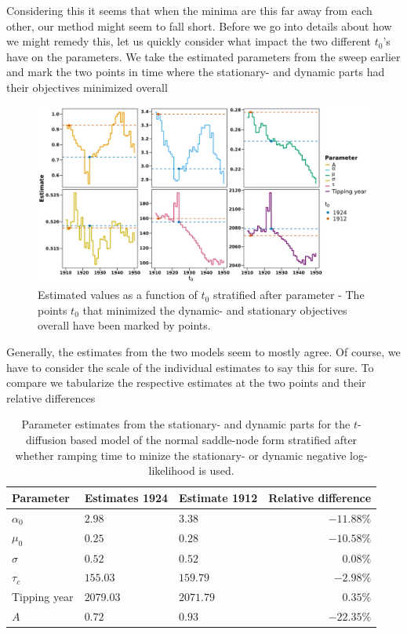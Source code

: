 Considering this it seems that when the minima are this far away from each other, our method might seem to fall short. Before we go into details about how we might remedy this, let us quickly consider what impact the two different $t_0$'s have on the parameters. We take the estimated parameters from the sweep earlier and mark the two points in time where the stationary- and dynamic parts had their objectives minimized overall
\begin{figure}[h!]
    \begin{center}
        \includegraphics[scale = .09]{figures/estimators_full_plot.jpeg}
        \caption{Estimated values as a function of $t_0$ stratified after parameter - The points $t_0$ that minimized the dynamic- and stationary objectives overall have been marked by points.}
    \end{center}
    \label{figure:AMOC_estimates_t_0}
\end{figure}
\newpage
\noindent Generally, the estimates from the two models seem to mostly agree. Of course, we have to consider the scale of the individual estimates to say this for sure. To compare we tabularize the respective estimates at the two points and their relative differences
\begin{table}[h!]
    \centering
    \begin{tabular}{lllr}
     Parameter & Estimates 1924 & Estimate 1912 & Relative difference \\ \hline
    $\alpha_0$ & $2.98$ & 3$.38$ & $-11.88\%$ \\ 
      $\mu_0$ & $0.25$ & $0.28$ & $-10.58\%$ \\ 
      $\sigma$ & $0.52$ & $0.52$ & 0$.08\%$ \\ 
      $\tau_c$ & $155.03$ & $159.79$ & $-2.98\%$ \\ 
      Tipping year & $2079.03$ & $2071.79$ & $0.35\%$\\ 
      $A$ & $0.72$ & $0.93$ & $-22.35\%$ \\ 
       \hline
    \end{tabular}
    \caption{Parameter estimates from the stationary- and dynamic parts for the $t$-diffusion based model of the normal saddle-node form stratified after whether ramping time to minize the stationary- or dynamic negative log-likelihood is used.}
    \label{table:Estimates_t0_AMOC}
\end{table}\\
